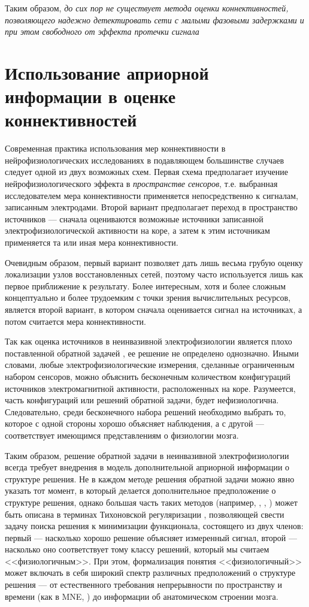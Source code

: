 Таким образом, \emph{до сих пор не существует метода оценки коннективностей,
позволяющего надежно детектировать сети с малыми фазовыми задержками и при этом свободного
от эффекта протечки сигнала}


\section{Использование априорной информации в оценке коннективностей}

Современная практика использования мер коннективности в нейрофизиологических
исследованиях в подавляющем большинстве случаев следует одной из двух возможных схем.
Первая схема предполагает изучение нейрофизиологического эффекта  в \emph{пространстве сенсоров},
т.е. выбранная исследователем мера коннективности применяется непосредственно к сигналам,
записанным электродами.
Второй вариант предполагает переход в пространство источников --- сначала оцениваются
возможные источники записанной электрофизиологической активности на коре, а затем к этим
источникам применяется та или иная  мера коннективности.

Очевидным образом, первый вариант позволяет дать лишь весьма грубую оценку локализации
узлов восстановленных сетей, поэтому часто используется лишь как первое приближение к результату.
Более интересным, хотя и более сложным концептуально и более
трудоемким с точки зрения вычислительных ресурсов, является второй вариант, в котором
сначала оценивается сигнал на источниках, а потом считается мера коннективности.

Так как оценка источников в неинвазивной электрофизиологии является
плохо поставленной обратной задачей ,
ее решение не определено однозначно. Иными словами, любые электрофизиологические измерения,
сделанные ограниченным набором сенсоров, можно объяснить бесконечным количеством конфигураций
источников электромагнитной активности, расположенных на коре. Разумеется, часть конфигураций
или решений обратной задачи, будет нефизиологична. Следовательно, среди бесконечного набора
решений необходимо выбрать то, которое с одной стороны хорошо объясняет наблюдения, а с другой ---
соответствует имеющимся представлениям о физиологии мозга.

Таким образом, решение обратной задачи в неинвазивной электрофизиологии всегда требует внедрения
в модель дополнительной априорной информации о структуре решения. Не в каждом методе
решения обратной задачи можно явно указать тот момент, в который делается дополнительное
предположение о структуре решения, однако большая часть таких методов
(например, \cite{mne}, \cite{min_current}, \cite{loreta})
может быть описана в терминах Тихоновской регуляризации \cite{tikhonov}, позволяющей свести задачу поиска
решения к минимизации функционала, состоящего из двух членов: первый --- насколько хорошо
решение объясняет измеренный сигнал, второй --- насколько оно соответствует тому классу решений,
который мы считаем <<физиологичным>>. При этом, формализация понятия <<физиологичный>> может
включать в себя широкий спектр различных предположений о структуре решения
--- от естественного требования непрерывности по пространству и времени (как в MNE, \cite{mne}) до
информации об анатомическом строении мозга.

